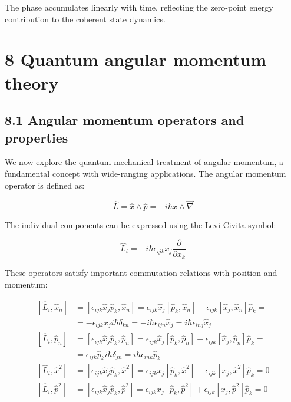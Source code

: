\documentclass[italian]{HKNdocument}
\begin{document}
The phase accumulates linearly with time, reflecting the zero-point energy contribution to the coherent state dynamics.

\section*{8 Quantum angular momentum theory}
\subsection*{8.1 Angular momentum operators and properties}
We now explore the quantum mechanical treatment of angular momentum, a fundamental concept with wide-ranging applications. The angular momentum operator is defined as:

\begin{equation*}
\hat{L}=\hat{x} \wedge \hat{p}=-i \hbar x \wedge \vec{\nabla} \tag{8.1}
\end{equation*}

The individual components can be expressed using the Levi-Civita symbol:

\begin{equation*}
\hat{L}_{i}=-i \hbar \epsilon_{i j k} x_{j} \frac{\partial}{\partial x_{k}} \tag{8.2}
\end{equation*}

These operators satisfy important commutation relations with position and momentum:

\begin{align*}
{\left[\hat{L}_{i}, \hat{x}_{n}\right] } & =\left[\epsilon_{i j k} \hat{x}_{j} \hat{p}_{k}, \hat{x}_{n}\right]=\epsilon_{i j k} \hat{x}_{j}\left[\hat{p}_{k}, \hat{x}_{n}\right]+\epsilon_{i j k}\left[\hat{x}_{j}, \hat{x}_{n}\right] \hat{p}_{k}= \\
& =-\epsilon_{i j k} x_{j} i \hbar \delta_{k n}=-i \hbar \epsilon_{i j n} \hat{x}_{j}=i \hbar \epsilon_{i n j} \hat{x}_{j}  \tag{8.3}\\
{\left[\hat{L}_{i}, \hat{p}_{n}\right] } & =\left[\epsilon_{i j k} \hat{x}_{j} \hat{p}_{k}, \hat{p}_{n}\right]=\epsilon_{i j k} \hat{x}_{j}\left[\hat{p}_{k}, \hat{p}_{n}\right]+\epsilon_{i j k}\left[\hat{x}_{j}, \hat{p}_{n}\right] \hat{p}_{k}= \\
& =\epsilon_{i j k} \hat{p}_{k} i \hbar \delta_{j n}=i \hbar \epsilon_{i n k} \hat{p}_{k}  \tag{8.4}\\
{\left[\hat{L}_{i}, \hat{x}^{2}\right] } & =\left[\epsilon_{i j k} \hat{x}_{j} \hat{p}_{k}, \hat{x}^{2}\right]=\epsilon_{i j k} x_{j}\left[\hat{p}_{k}, \hat{x}^{2}\right]+\epsilon_{i j k}\left[x_{j}, \hat{x}^{2}\right] \hat{p}_{k}=0  \tag{8.5}\\
{\left[\hat{L}_{i}, \hat{p}^{2}\right] } & =\left[\epsilon_{i j k} \hat{x}_{j} \hat{p}_{k}, \hat{p}^{2}\right]=\epsilon_{i j k} x_{j}\left[\hat{p}_{k}, \hat{p}^{2}\right]+\epsilon_{i j k}\left[x_{j}, \hat{p}^{2}\right] \hat{p}_{k}=0 \tag{8.6}
\end{align*}
\end{document}
